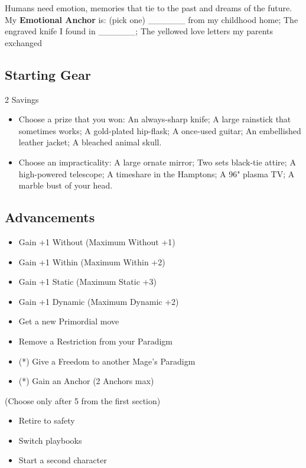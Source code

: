 \documentclass[
  oneside,
  statementpaper,
  9pt]{memoir}
\begin{document}
Humans need emotion, memories that tie to the past and dreams of the
future. My \textbf{Emotional Anchor} is: (pick one) \_\_\_\_\_\_ from my
childhood home; The engraved knife I found in \_\_\_\_\_\_; The yellowed
love letters my parents exchanged

\hypertarget{starting-gear-5}{%
\subsection{Starting Gear}\label{starting-gear-5}}

2 Savings

\begin{itemize}
\tightlist
\item
  Choose a prize that you won: An always-sharp knife; A large rainstick
  that sometimes works; A gold-plated hip-flask; A once-used guitar; An
  embellished leather jacket; A bleached animal skull.
\item
  Choose an impracticality: A large ornate mirror; Two sets black-tie
  attire; A high-powered telescope; A timeshare in the Hamptons; A 96"
  plasma TV; A marble bust of your head.
\end{itemize}

\hypertarget{advancements-5}{%
\subsection{Advancements}\label{advancements-5}}

\begin{itemize}
\tightlist
\item
  Gain +1 Without (Maximum Without +1)
\item
  Gain +1 Within (Maximum Within +2)
\item
  Gain +1 Static (Maximum Static +3)
\item
  Gain +1 Dynamic (Maximum Dynamic +2)
\item
  Get a new Primordial move
\item
  Remove a Restriction from your Paradigm
\item
  (*) Give a Freedom to another Mage's Paradigm
\item
  (*) Gain an Anchor (2 Anchors max)
\end{itemize}

(Choose only after 5 from the first section)

\begin{itemize}
\tightlist
\item
  Retire to safety
\item
  Switch playbooks
\item
  Start a second character
\end{itemize}
\end{document}

